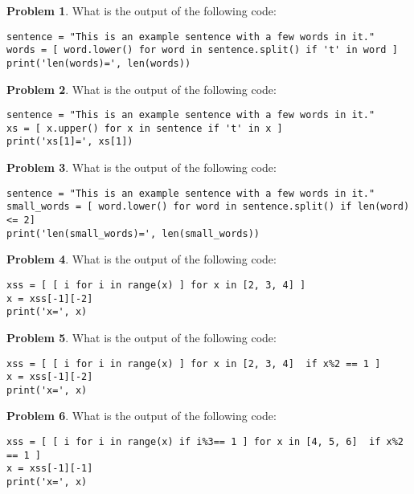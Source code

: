 \documentclass[10pt]{article}
\theoremstyle{definition}
\newtheorem{problem}{Problem}
\begin{document}
\begin{problem}
    What is the output of the following code:
\end{problem}
\begin{lstlisting}
sentence = "This is an example sentence with a few words in it."
words = [ word.lower() for word in sentence.split() if 't' in word ]
print('len(words)=', len(words))
\end{lstlisting}
\vspace{1.2in}


\begin{problem}
    What is the output of the following code:
\end{problem}
\begin{lstlisting}
sentence = "This is an example sentence with a few words in it."
xs = [ x.upper() for x in sentence if 't' in x ]
print('xs[1]=', xs[1])
\end{lstlisting}
\vspace{1.2in}


\begin{problem}
    What is the output of the following code:
\end{problem}
\begin{lstlisting}
sentence = "This is an example sentence with a few words in it."
small_words = [ word.lower() for word in sentence.split() if len(word) <= 2]
print('len(small_words)=', len(small_words))
\end{lstlisting}
\vspace{1.2in}


\newpage
\begin{problem}
    What is the output of the following code:
\end{problem}
\begin{lstlisting}
xss = [ [ i for i in range(x) ] for x in [2, 3, 4] ]
x = xss[-1][-2]
print('x=', x)
\end{lstlisting}
\vspace{3in}

\begin{problem}
    What is the output of the following code:
\end{problem}
\begin{lstlisting}
xss = [ [ i for i in range(x) ] for x in [2, 3, 4]  if x%2 == 1 ]
x = xss[-1][-2]
print('x=', x)
\end{lstlisting}
\vspace{2.0in}


\newpage
\begin{problem}
    What is the output of the following code:
\end{problem}
\begin{lstlisting}
xss = [ [ i for i in range(x) if i%3== 1 ] for x in [4, 5, 6]  if x%2 == 1 ]
x = xss[-1][-1]
print('x=', x)
\end{lstlisting}
\vspace{3.0in}
\end{document}
